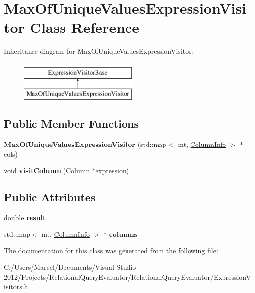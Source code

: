 \hypertarget{class_max_of_unique_values_expression_visitor}{\section{Max\+Of\+Unique\+Values\+Expression\+Visitor Class Reference}
\label{class_max_of_unique_values_expression_visitor}
}
Inheritance diagram for Max\+Of\+Unique\+Values\+Expression\+Visitor\+:\begin{figure}[H]
\begin{center}
\leavevmode
\includegraphics[height=2.000000cm]{class_max_of_unique_values_expression_visitor}
\end{center}
\end{figure}
\subsection*{Public Member Functions}
\begin{DoxyCompactItemize}
\item 
\hypertarget{class_max_of_unique_values_expression_visitor_adf863a6e2406f90466e4f4decab1f4e4}{{\bfseries Max\+Of\+Unique\+Values\+Expression\+Visitor} (std\+::map$<$ int, \hyperlink{class_column_info}{Column\+Info} $>$ $\ast$cols)}\label{class_max_of_unique_values_expression_visitor_adf863a6e2406f90466e4f4decab1f4e4}

\item 
\hypertarget{class_max_of_unique_values_expression_visitor_a1e924d4d6d63474f401adc0c8ba6a455}{void {\bfseries visit\+Column} (\hyperlink{class_column}{Column} $\ast$expression)}\label{class_max_of_unique_values_expression_visitor_a1e924d4d6d63474f401adc0c8ba6a455}

\end{DoxyCompactItemize}
\subsection*{Public Attributes}
\begin{DoxyCompactItemize}
\item 
\hypertarget{class_max_of_unique_values_expression_visitor_a4d1359a778ac14a3709c63bff3a01383}{double {\bfseries result}}\label{class_max_of_unique_values_expression_visitor_a4d1359a778ac14a3709c63bff3a01383}

\item 
\hypertarget{class_max_of_unique_values_expression_visitor_a1f0ca5cd4e5fd0eb513fa64ea21ecae6}{std\+::map$<$ int, \hyperlink{class_column_info}{Column\+Info} $>$ $\ast$ {\bfseries columns}}\label{class_max_of_unique_values_expression_visitor_a1f0ca5cd4e5fd0eb513fa64ea21ecae6}

\end{DoxyCompactItemize}


The documentation for this class was generated from the following file\+:\begin{DoxyCompactItemize}
\item 
C\+:/\+Users/\+Marcel/\+Documents/\+Visual Studio 2012/\+Projects/\+Relational\+Query\+Evaluator/\+Relational\+Query\+Evaluator/Expression\+Visitors.\+h\end{DoxyCompactItemize}
